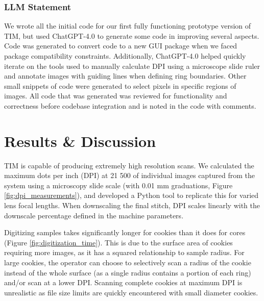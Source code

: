 \documentclass[a4paper,12pt]{article}
\begin{document}
\subsubsection{LLM Statement}
We wrote all the initial code for our first fully functioning prototype version of TIM, but used ChatGPT-4.0 to generate some
code in improving several aspects. Code was generated to convert code to a new GUI package when we faced package compatibility constraints. 
Additionally, ChatGPT-4.0 helped quickly iterate on the tools used to manually calculate DPI using a microscope slide ruler and annotate images with guiding lines when defining ring boundaries. 
Other small snippets of code were generated to select pixels in specific regions of images. All code that was generated was reviewed for functionality and correctness before codebase integration and is noted in the code with comments.

\section{Results \& Discussion} 

TIM is capable of producing extremely high resolution scans. We calculated the maximum dots per inch (DPI) at 21 500 of individual images captured from the system using a microscopy slide scale (with 0.01 mm graduations, Figure \ref{fig:dpi_measurements}), and developed a Python tool to replicate this for varied lens focal lengths. When downscaling the final stitch, 
DPI scales linearly with the downscale percentage defined in the machine parameters. 

Digitizing samples takes significantly longer for cookies than it does for cores (Figure \ref{fig:digitization_time}). This is due to the surface area of cookies requiring more images, as it has a squared relationship to sample radius.
For large cookies, the operator can choose to selectively scan a radius of the cookie instead of the whole surface (as a single radius contains a portion of each ring) and/or scan at a lower DPI. Scanning complete cookies at maximum DPI is unrealistic as file size limits are quickly encountered with small diameter cookies. 
\end{document}
